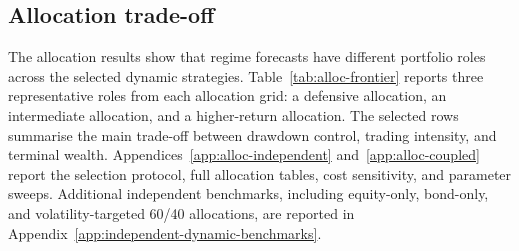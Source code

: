 \documentclass[10pt]{article}
\begin{document}
\subsection{Allocation trade-off}
\label{sec:alloc-results}
\label{subsec:results-dynamic-allocation}

The allocation results show that regime forecasts have different portfolio roles across the
selected dynamic strategies. Table~\ref{tab:alloc-frontier} reports three representative
roles from each allocation grid: a defensive allocation, an intermediate allocation, and a
higher-return allocation. The selected rows summarise the main trade-off between drawdown
control, trading intensity, and terminal wealth. Appendices~\ref{app:alloc-independent}
and~\ref{app:alloc-coupled} report the selection protocol, full allocation tables, cost
sensitivity, and parameter sweeps. Additional independent benchmarks, including equity-only,
bond-only, and volatility-targeted 60/40 allocations, are reported in
Appendix~\ref{app:independent-dynamic-benchmarks}.
\end{document}
